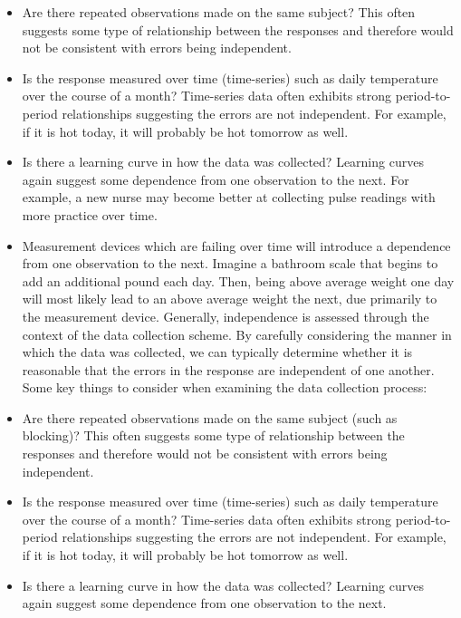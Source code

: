\documentclass[]{book}
\providecommand{\tightlist}{%
  \setlength{\itemsep}{0pt}\setlength{\parskip}{0pt}}
\theoremstyle{plain}
\theoremstyle{mydefn}
\theoremstyle{myexmpl}
\theoremstyle{remark}
\begin{document}
\begin{itemize}
\tightlist
\item
  Are there repeated observations made on the same subject? This often
  suggests some type of relationship between the responses and therefore
  would not be consistent with errors being independent.
\item
  Is the response measured over time (time-series) such as daily
  temperature over the course of a month? Time-series data often
  exhibits strong period-to-period relationships suggesting the errors
  are not independent. For example, if it is hot today, it will probably
  be hot tomorrow as well.
\item
  Is there a learning curve in how the data was collected? Learning
  curves again suggest some dependence from one observation to the next.
  For example, a new nurse may become better at collecting pulse
  readings with more practice over time.
\item
  Measurement devices which are failing over time will introduce a
  dependence from one observation to the next. Imagine a bathroom scale
  that begins to add an additional pound each day. Then, being above
  average weight one day will most likely lead to an above average
  weight the next, due primarily to the measurement device. Generally,
  independence is assessed through the context of the data collection
  scheme. By carefully considering the manner in which the data was
  collected, we can typically determine whether it is reasonable that
  the errors in the response are independent of one another. Some key
  things to consider when examining the data collection process:
\item
  Are there repeated observations made on the same subject (such as
  blocking)? This often suggests some type of relationship between the
  responses and therefore would not be consistent with errors being
  independent.
\item
  Is the response measured over time (time-series) such as daily
  temperature over the course of a month? Time-series data often
  exhibits strong period-to-period relationships suggesting the errors
  are not independent. For example, if it is hot today, it will probably
  be hot tomorrow as well.
\item
  Is there a learning curve in how the data was collected? Learning
  curves again suggest some dependence from one observation to the next.
\end{itemize}
\end{document}
